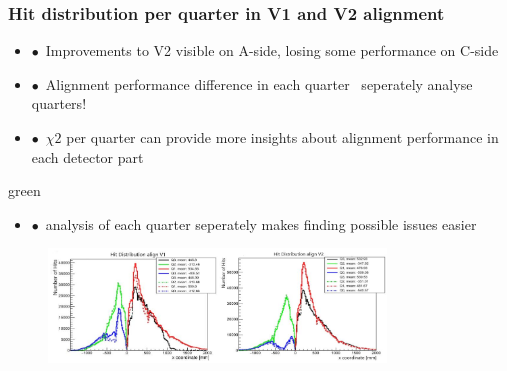 \documentclass[aspectratio=1610, 12pt, xcolor=dvipsnames]{beamer}
\begin{document}
\begin{frame}\frametitle{Hit distribution per quarter in V1 and V2 alignment}
  \begin{itemize}
    \item $\bullet$\, Improvements to V2 visible on A-side, losing some performance on C-side
    \item $\bullet$\, Alignment performance difference in each quarter \to\, seperately analyse quarters!
    \item $\bullet$\, $\chi2$ per quarter can provide more insights about alignment performance in each detector part
  \end{itemize}
  \begin{mybox}{green}{}
    \begin{itemize}
      \item $\bullet$\, analysis of each quarter seperately makes finding possible issues easier
    \end{itemize}
  \end{mybox}
  \begin{figure}
      \includegraphics[width=0.8\textwidth]{logos/v1_v2.png}%
  \end{figure}
\end{frame}
\end{document}
